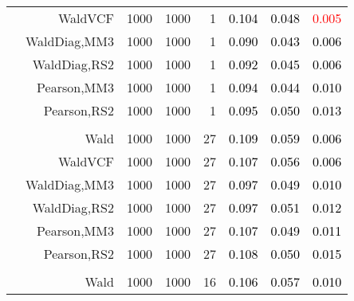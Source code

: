 \documentclass[
]{article}
\begin{document}
\begin{table}[H]
{\begin{tabular}[t]{lrrrrrrr}
\hspace{1em} & WaldVCF & 1000 & 1000 & 1 & \textcolor{black}{0.104} & \textcolor{black}{0.048} & \textcolor{red}{0.005}\\

\hspace{1em} & WaldDiag,MM3 & 1000 & 1000 & 1 & \textcolor{black}{0.090} & \textcolor{black}{0.043} & \textcolor{black}{0.006}\\

\hspace{1em} & WaldDiag,RS2 & 1000 & 1000 & 1 & \textcolor{black}{0.092} & \textcolor{black}{0.045} & \textcolor{black}{0.006}\\

\hspace{1em} & Pearson,MM3 & 1000 & 1000 & 1 & \textcolor{black}{0.094} & \textcolor{black}{0.044} & \textcolor{black}{0.010}\\

\hspace{1em} & Pearson,RS2 & 1000 & 1000 & 1 & \textcolor{black}{0.095} & \textcolor{black}{0.050} & \textcolor{black}{0.013}\\
\cmidrule{1-8}
\addlinespace[0.3em]
\multicolumn{8}{l}{\textbf{1F 15V}}\\
\hspace{1em} & Wald & 1000 & 1000 & 27 & \textcolor{black}{0.109} & \textcolor{black}{0.059} & \textcolor{black}{0.006}\\

\hspace{1em} & WaldVCF & 1000 & 1000 & 27 & \textcolor{black}{0.107} & \textcolor{black}{0.056} & \textcolor{black}{0.006}\\

\hspace{1em} & WaldDiag,MM3 & 1000 & 1000 & 27 & \textcolor{black}{0.097} & \textcolor{black}{0.049} & \textcolor{black}{0.010}\\

\hspace{1em} & WaldDiag,RS2 & 1000 & 1000 & 27 & \textcolor{black}{0.097} & \textcolor{black}{0.051} & \textcolor{black}{0.012}\\

\hspace{1em} & Pearson,MM3 & 1000 & 1000 & 27 & \textcolor{black}{0.107} & \textcolor{black}{0.049} & \textcolor{black}{0.011}\\

\hspace{1em} & Pearson,RS2 & 1000 & 1000 & 27 & \textcolor{black}{0.108} & \textcolor{black}{0.050} & \textcolor{black}{0.015}\\
\cmidrule{1-8}
\addlinespace[0.3em]
\multicolumn{8}{l}{\textbf{2F 10V}}\\
\hspace{1em} & Wald & 1000 & 1000 & 16 & \textcolor{black}{0.106} & \textcolor{black}{0.057} & \textcolor{black}{0.010}\\


\end{tabular}}
\end{table}
\end{document}

